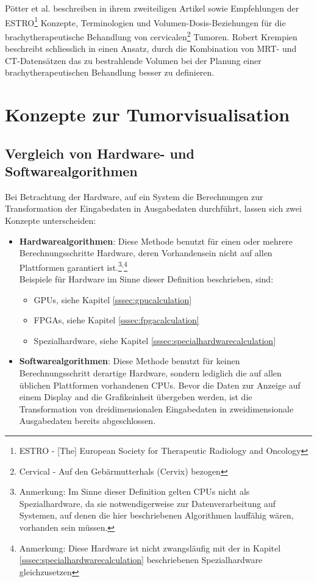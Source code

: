 \documentclass[pdftex,a4paper,titlepage,12pt]{scrartcl}
\newtheorem[L]{boxedDefinition}{Definition}
\begin{document}
\begin{itemize}
 Pötter et al. beschreiben in ihrem zweiteiligen Artikel \cite{Poetter2005} sowie \cite{Poetter2006} Empfehlungen der ESTRO\footnote{ESTRO - [The] European Society for Therapeutic Radiology and Oncology} Konzepte, Terminologien und Volumen-Dosis-Beziehungen für die brachytherapeutische Behandlung von cervicalen\footnote{Cervical - Auf den Gebärmutterhals (Cervix) bezogen} Tumoren. Robert Krempien beschreibt schliesslich in \cite{Krempien2003} einen Ansatz, durch die Kombination von MRT- und CT-Datensätzen das zu bestrahlende Volumen bei der Planung einer brachytherapeutischen Behandlung besser zu definieren.
\end{itemize}

\section{Konzepte zur Tumorvisualisation}\label{ssec:concepts}
\subsection{Vergleich von Hardware- und Softwarealgorithmen}\label{ssec:swhwcomparison}
Bei Betrachtung der Hardware, auf ein System die Berechnungen zur Transformation der Eingabedaten in Ausgabedaten durchführt, lassen  sich zwei Konzepte unterscheiden:
\begin{itemize}
 \item \textbf{Hardwarealgorithmen}: Diese Methode benutzt für einen oder mehrere Berechnungsschritte Hardware, deren Vorhandensein nicht auf allen Plattformen garantiert ist.\footnote{Anmerkung: Im Sinne dieser Definition gelten CPUs nicht als Spezialhardware, da sie notwendigerweise zur Datenverarbeitung auf Systemen, auf denen die hier beschriebenen Algorithmen lauffähig  wären, vorhanden sein müssen.}\textsuperscript{,}\footnote{Anmerkung: Diese Hardware ist nicht zwangsläufig mit der in Kapitel \ref{sssec:specialhardwarecalculation} beschriebenen Spezialhardware gleichzusetzen}\\
 Beispiele für Hardware im Sinne dieser Definition beschrieben, sind:
 \begin{itemize}
  \item GPUs, siehe Kapitel \vref{sssec:gpucalculation} 
  \item FPGAs, siehe Kapitel \vref{sssec:fpgacalculation}
  \item Spezialhardware, siehe Kapitel \vref{sssec:specialhardwarecalculation}
 \end{itemize}
 \item \textbf{Softwarealgorithmen}: Diese Methode benutzt für keinen Berechnungsschritt derartige Hardware, sondern lediglich die auf allen üblichen Plattformen vorhandenen CPUs. Bevor die Daten zur Anzeige auf einem Display and die Grafikeinheit übergeben werden, ist die Transformation von dreidimensionalen Eingabedaten in zweidimensionale Ausgabedaten bereits abgeschlossen.
\end{itemize}
\end{document}
